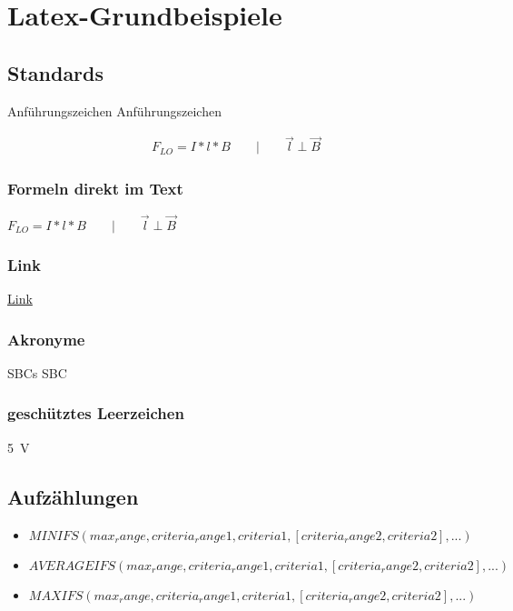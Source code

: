 \chapter{Latex-Grundbeispiele}\label{sec:neues_kapitel}

\section{Standards}
\glqq Anführungszeichen \grqq{}                          %
\grqq Anführungszeichen \grqq{}                          %

\begin{align}                                   %
    F_{LO} = I*l*B \qquad | \qquad \vec{l}  \perp \vec{B} \label{formel:lorentz}
\end{align}

\subsection{Formeln direkt im Text}
$F_{LO} = I*l*B \qquad | \qquad \vec{l}\perp \vec{B}$            %

\subsection{Link}
\href{https://www.dsl-ltd.co.uk/what-are-single-board-computers-and-how-are-they-used/}{Link}


\subsection{Akronyme}
\acp{SBC}
\acf{SBC}
\subsection*{geschütztes Leerzeichen}
5~V

\section{Aufzählungen}

\begin{itemize}                                         %
        \item $MINIFS(max_range, criteria_range1, criteria1, [criteria_range2, criteria2], ...)$
        \item $AVERAGEIFS(max_range, criteria_range1, criteria1, [criteria_range2, criteria2], ...)$
        \item $MAXIFS(max_range, criteria_range1, criteria1, [criteria_range2, criteria2], ...)$\cite{SBCs,fritzing}
\end{itemize}

